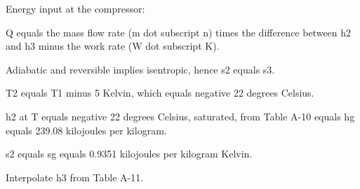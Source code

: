 Energy input at the compressor:

Q equals the mass flow rate (m dot subscript n) times the difference between h2 and h3 minus the work rate (W dot subscript K).

Adiabatic and reversible implies isentropic, hence s2 equals s3.

T2 equals T1 minus 5 Kelvin, which equals negative 22 degrees Celsius.

h2 at T equals negative 22 degrees Celsius, saturated, from Table A-10 equals hg equals 239.08 kilojoules per kilogram.

s2 equals sg equals 0.9351 kilojoules per kilogram Kelvin.

Interpolate h3 from Table A-11.
